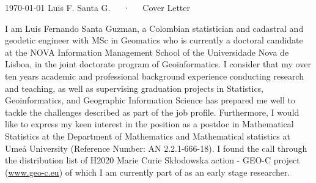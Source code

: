 \documentclass[11pt, a4paper]{awesome-cv}
\begin{document}
\makecvheader[R]

\makecvfooter
  {\today}
    {Luis F. Santa G.~~~·~~~Cover Letter}
  {}

\makelettertitle

\begin{cvletter}

I am Luis Fernando Santa Guzman, a Colombian statistician and cadastral and geodetic engineer with MSc in Geomatics who is currently a doctoral candidate at the NOVA Information Management School of the Universidade Nova de Lisboa, in the joint doctorate program of Geoinformatics. I consider that my over ten years academic and professional background experience conducting research and teaching, as well as supervising graduation projects in Statistics, Geoinformatics, and Geographic Information Science has prepared me well to tackle the challenges described as part of the job profile. Furthermore, I would like to express my keen interest in the position as a postdoc in Mathematical Statistics at the Department of Mathematics and Mathematical statistics at Umeå University (Reference Number: AN 2.2.1-666-18). I found the call through the distribution list of H2020 Marie Curie Skłodowska action - GEO-C project (\url{www.geo-c.eu}) of which I am currently part of as an early stage researcher. 


\end{cvletter}
\end{document}
